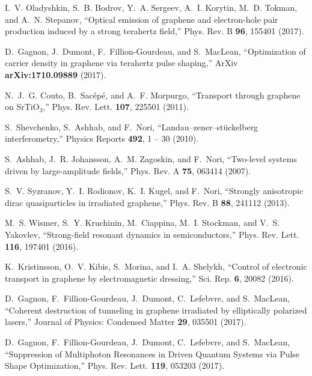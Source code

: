 \documentclass[9pt,twocolumn,twoside]{osajnl}
\begin{document}
\begin{thebibliography}{10}
I.~V. Oladyshkin, S.~B. Bodrov, Y.~A. Sergeev, A.~I. Korytin, M.~D. Tokman, and
  A.~N. Stepanov, \enquote{{Optical emission of graphene and electron-hole pair
  production induced by a strong terahertz field},} Phys. Rev. B \textbf{96},
  155401 (2017).

D.~Gagnon, J.~Dumont, F.~Fillion-Gourdeau, and S.~MacLean,
  \enquote{Optimization of carrier density in graphene via terahertz pulse
  shaping,} ArXiv \textbf{arXiv:1710.09889} (2017).

N.~J.~G. Couto, B.~Sac\'ep\'e, and A.~F. Morpurgo, \enquote{Transport through
  graphene on {SrTiO}$_{3}$,} Phys. Rev. Lett. \textbf{107}, 225501 (2011).

S.~Shevchenko, S.~Ashhab, and F.~Nori, \enquote{Landau--zener--st{\"u}ckelberg
  interferometry,} Physics Reports \textbf{492}, 1 -- 30 (2010).

S.~Ashhab, J.~R. Johansson, A.~M. Zagoskin, and F.~Nori, \enquote{Two-level
  systems driven by large-amplitude fields,} Phys. Rev. A \textbf{75}, 063414
  (2007).

S.~V. Syzranov, Y.~I. Rodionov, K.~I. Kugel, and F.~Nori, \enquote{Strongly
  anisotropic dirac quasiparticles in irradiated graphene,} Phys. Rev. B
  \textbf{88}, 241112 (2013).

M.~S. Wismer, S.~Y. Kruchinin, M.~Ciappina, M.~I. Stockman, and V.~S. Yakovlev,
  \enquote{Strong-field resonant dynamics in semiconductors,} Phys. Rev. Lett.
  \textbf{116}, 197401 (2016).

K.~Kristinsson, O.~V. Kibis, S.~Morina, and I.~A. Shelykh, \enquote{{Control of
  electronic transport in graphene by electromagnetic dressing},} Sci. Rep.
  \textbf{6}, 20082 (2016).

D.~Gagnon, F.~Fillion-Gourdeau, J.~Dumont, C.~Lefebvre, and S.~MacLean,
  \enquote{Coherent destruction of tunneling in graphene irradiated by
  elliptically polarized lasers,} Journal of Physics: Condensed Matter
  \textbf{29}, 035501 (2017).

D.~Gagnon, F.~Fillion-Gourdeau, J.~Dumont, C.~Lefebvre, and S.~MacLean,
  \enquote{{Suppression of Multiphoton Resonances in Driven Quantum Systems via
  Pulse Shape Optimization},} Phys. Rev. Lett. \textbf{119}, 053203 (2017).

\end{thebibliography}
\end{document}
